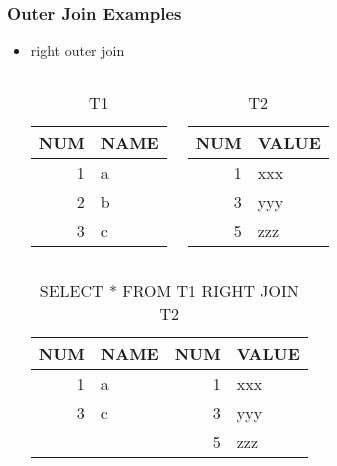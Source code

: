 \documentclass[dvipsnames]{beamer}
\theoremstyle{plain}
\begin{document}
\begin{frame}[fragile]
  \frametitle{Outer Join Examples}

  \begin{itemize}
    \item right outer join
    \begin{columns}[t]
      \begin{tiny}
      \begin{table}
        \caption{T1}
        \begin{tabular}{|r|l|}\hline
NUM & NAME \\\hline\hline
  1 & a    \\\hline
  2 & b    \\\hline
  3 & c    \\\hline
        \end{tabular}
      \end{table}
      \end{tiny}

      \begin{tiny}
      \begin{table}
        \caption{T2}
        \begin{tabular}{|r|l|}\hline
NUM & VALUE \\\hline\hline
  1 & xxx   \\\hline
  3 & yyy   \\\hline
  5 & zzz   \\\hline
        \end{tabular}
      \end{table}
      \end{tiny}
    \end{columns}

    \pause
    \begin{center}
      \begin{tiny}
      \begin{table}
        \caption{SELECT * FROM T1 RIGHT JOIN T2}
        \begin{tabular}{|r|l|r|l|}\hline
NUM & NAME & NUM & VALUE \\\hline\hline
  1 & a    &   1 & xxx   \\\hline
  3 & c    &   3 & yyy   \\\hline
    &      &   5 & zzz   \\\hline
        \end{tabular}
      \end{table}
      \end{tiny}
    \end{center}
  \end{itemize}
\end{frame}
\end{document}
